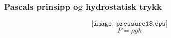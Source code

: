 \documentclass[aspectratio=169,xcolor=dvipsnames]{beamer}
\begin{document}
%
%
%
%
%
%
\begin{frame}
	\frametitle{Pascals prinsipp og hydrostatisk trykk}

	$$\texttt{[image: pressure18.eps]}$$
$$P = \rho g h$$
\end{frame}
%
%
\end{document}
